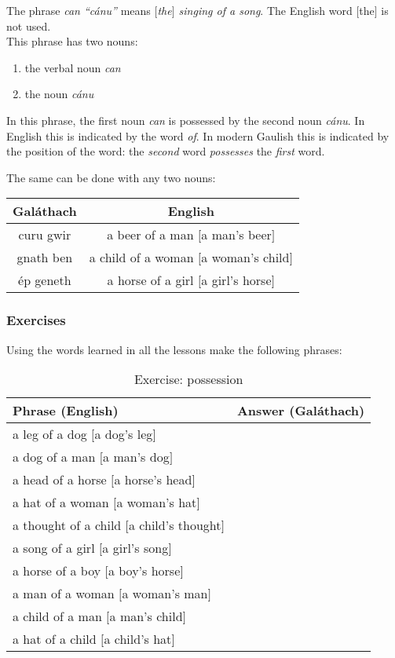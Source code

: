 The phrase \textit{can ``c\'{a}nu''} means \textit{$[$the$]$ singing of a song}. The English word $[$the$]$ is not used.\\

This phrase has two nouns:
\begin{enumerate}
 \item{the verbal noun \textit{can}}
 \item{the noun \textit{c\'{a}nu}}
\end{enumerate}
In this phrase, the first noun \textit{can} is possessed by the second noun \textit{c\'{a}nu}. In English this is indicated by the word \textit{of}. In modern Gaulish this is indicated by the position of the word: the \textit{second} word \textit{possesses} the \textit{first} word.

The same can be done with any two nouns:
\begin{table}[H]
\centering
\begin{tabu}{c|c}
  \textbf{Gal\'{a}thach} & \textbf{English}\\
  \toprule
  curu gwir & a beer of a man $[$a man's beer$]$\\
  gnath ben & a child of a woman $[$a woman's child$]$\\
  \'{e}p geneth & a horse of a girl $[$a girl's horse$]$
\end{tabu}
\label{examples_possession_word_position}
\end{table}

\subsubsection{Exercises}

Using the words learned in all the lessons make the following phrases:
\begin{table}[H]
\centering
\begin{tabu}{|l|p{10.0cm}|}
  \toprule
  \textbf{Phrase (English)} & \textbf{Answer (Gal\'{a}thach)}\\
  \toprule
  a leg of a dog $[$a dog's leg$]$ & \\
  \midrule
  a dog of a man $[$a man's dog$]$ & \\
  \midrule
  a head of a horse $[$a horse's head$]$ & \\
  \midrule
  a hat of a woman $[$a woman's hat$]$ & \\
  \midrule
  a thought of a child $[$a child's thought$]$ & \\
  \midrule
  a song of a girl $[$a girl's song$]$ & \\
  \midrule
  a horse of a boy $[$a boy's horse$]$ & \\
  \midrule
  a man of a woman $[$a woman's man$]$ & \\
  \midrule
  a child of a man $[$a man's child$]$ & \\
  \midrule
  a hat of a child $[$a child's hat$]$ & \\
  \bottomrule
\end{tabu}
\label{exercises_possession}
\caption{Exercise: possession}
\end{table}

